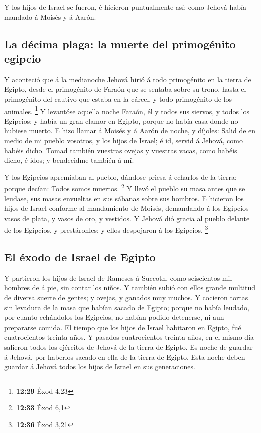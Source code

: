  Y los hijos de Israel se fueron, é hicieron puntualmente
así; como Jehová había mandado á Moisés y á Aarón.

\hypertarget{la-duxe9cima-plaga-la-muerte-del-primoguxe9nito-egipcio}{%
\subsection{La décima plaga: la muerte del primogénito
egipcio}\label{la-duxe9cima-plaga-la-muerte-del-primoguxe9nito-egipcio}}

 Y aconteció que á la medianoche Jehová hirió á todo
primogénito en la tierra de Egipto, desde el primogénito de Faraón que
se sentaba sobre su trono, hasta el primogénito del cautivo que estaba
en la cárcel, y todo primogénito de los animales. \footnote{\textbf{12:29}
  Éxod 4,23}  Y levantóse aquella noche Faraón, él y
todos sus siervos, y todos los Egipcios; y había un gran clamor en
Egipto, porque no había casa donde no hubiese muerto.  E
hizo llamar á Moisés y á Aarón de noche, y díjoles: Salid de en medio de
mi pueblo vosotros, y los hijos de Israel; é id, servid á Jehová, como
habéis dicho.  Tomad también vuestras ovejas y vuestras
vacas, como habéis dicho, é idos; y bendecidme también á mí.

 Y los Egipcios apremiaban al pueblo, dándose priesa á
echarlos de la tierra; porque decían: Todos somos muertos. \footnote{\textbf{12:33}
  Éxod 6,1}  Y llevó el pueblo su masa antes que se
leudase, sus masas envueltas en sus sábanas sobre sus hombros.
 E hicieron los hijos de Israel conforme al mandamiento
de Moisés, demandando á los Egipcios vasos de plata, y vasos de oro, y
vestidos.  Y Jehová dió gracia al pueblo delante de los
Egipcios, y prestáronles; y ellos despojaron á los Egipcios. \footnote{\textbf{12:36}
  Éxod 3,21}

\hypertarget{el-uxe9xodo-de-israel-de-egipto}{%
\subsection{El éxodo de Israel de
Egipto}\label{el-uxe9xodo-de-israel-de-egipto}}

 Y partieron los hijos de Israel de Rameses á Succoth,
como seiscientos mil hombres de á pie, sin contar los niños.
 Y también subió con ellos grande multitud de diversa
suerte de gentes; y ovejas, y ganados muy muchos.  Y
cocieron tortas sin levadura de la masa que habían sacado de Egipto;
porque no había leudado, por cuanto echándolos los Egipcios, no habían
podido detenerse, ni aun prepararse comida.  El tiempo
que los hijos de Israel habitaron en Egipto, fué cuatrocientos treinta
años.  Y pasados cuatrocientos treinta años, en el mismo
día salieron todos los ejércitos de Jehová de la tierra de Egipto.
 Es noche de guardar á Jehová, por haberlos sacado en
ella de la tierra de Egipto. Esta noche deben guardar á Jehová todos los
hijos de Israel en sus generaciones.

